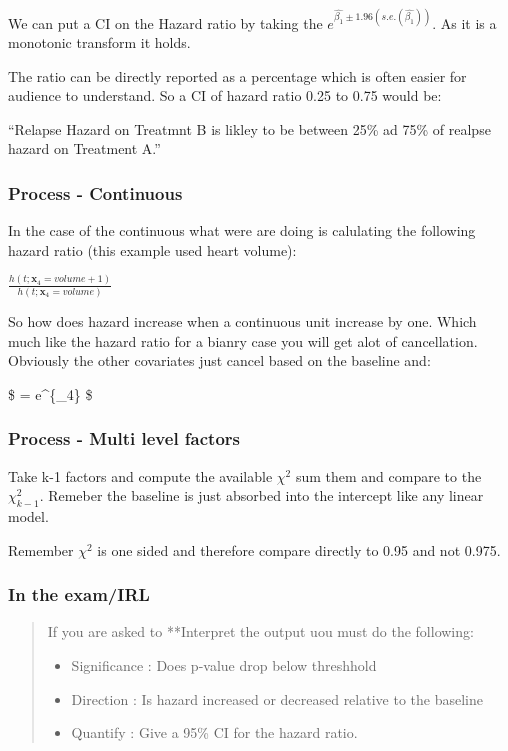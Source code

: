 \documentclass[
  letterpaper,
  DIV=11,
  numbers=noendperiod]{scrreprt}
\providecommand{\tightlist}{%
  \setlength{\itemsep}{0pt}\setlength{\parskip}{0pt}}\usepackage{longtable,booktabs,array}
\begin{document}
We can put a CI on the Hazard ratio by taking the
\(e^{\hat{\beta_1} \pm 1.96(s.e.(\hat{\beta_1}))}\). As it is a
monotonic transform it holds.

The ratio can be directly reported as a percentage which is often easier
for audience to understand. So a CI of hazard ratio 0.25 to 0.75 would
be:

``Relapse Hazard on Treatmnt B is likley to be between 25\% ad 75\% of
realpse hazard on Treatment A.''

\hypertarget{process---continuous}{%
\subsubsection{Process - Continuous}\label{process---continuous}}

In the case of the continuous what were are doing is calulating the
following hazard ratio (this example used heart volume):

\(\frac{h(t; \textbf{x}_4 = volume + 1)}{h(t; \textbf{x}_4 = volume)}\)

So how does hazard increase when a continuous unit increase by one.
Which much like the hazard ratio for a bianry case you will get alot of
cancellation. Obviously the other covariates just cancel based on the
baseline and:

\$ = e\^{}\{\beta\_4\} \$

\hypertarget{process---multi-level-factors}{%
\subsubsection{Process - Multi level
factors}\label{process---multi-level-factors}}

Take k-1 factors and compute the available \(\chi^2\) sum them and
compare to the \(\chi^2_{k-1}\). Remeber the baseline is just absorbed
into the intercept like any linear model.

Remember \(\chi^2\) is one sided and therefore compare directly to 0.95
and not 0.975.

\hypertarget{in-the-examirl}{%
\subsubsection{In the exam/IRL}\label{in-the-examirl}}

\begin{quote}
If you are asked to **Interpret the output uou must do the following:

\begin{itemize}
\tightlist
\item
  Significance : Does p-value drop below threshhold
\item
  Direction : Is hazard increased or decreased relative to the baseline
\item
  Quantify : Give a 95\% CI for the hazard ratio.
\end{itemize}
\end{quote}
\end{document}

